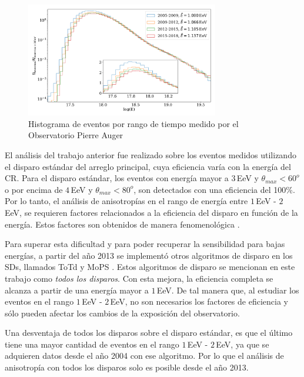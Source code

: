 \begin{figure}[htbp]
	\centering
	\includegraphics[width=0.75\textwidth]{histograma_evolucion_eventos.png}
	\caption{Histograma de eventos por rango de tiempo medido por el Observatorio Pierre Auger}
	\label{fig:futuro}
\end{figure}


El análisis del trabajo anterior fue realizado sobre los eventos medidos utilizando el disparo estándar del arreglo principal, cuya eficiencia varía con la energía del CR. Para el disparo estándar, los eventos con energía mayor a $3\,$EeV y $\theta_{max}<60^o$ o  por encima de $4\,$EeV y $\theta_{max}<80^o$, son detectados con una eficiencia del 100\%. Por lo tanto, el análisis de anisotropías en el rango de energía entre $1\,$EeV - $2\,$EeV, se requieren factores relacionados a la eficiencia del disparo en función de la energía. Estos factores son obtenidos de manera fenomenológica \cite{taborda}. 

Para superar esta dificultad y para poder recuperar la sensibilidad para bajas energías, a partir del año 2013  se implementó otros algoritmos de disparo en los SDs, llamados ToTd y MoPS \cite{pierre2013plans}. Estos algoritmos de disparo se mencionan en este trabajo como \textit{todos los disparos}. Con esta mejora, la eficiencia completa se alcanza a partir de una energía mayor a $1\,$EeV. De tal manera que, al estudiar los eventos en el rango $1\,$EeV - $2\,$EeV,  no son necesarios los factores de eficiencia y sólo pueden afectar los cambios de la exposición del observatorio.

Una desventaja de todos los disparos sobre el disparo estándar, es que el último tiene una mayor cantidad de eventos en el rango $1\,$EeV - $2\,$EeV, ya que se adquieren datos  desde el año 2004 con ese algoritmo. Por lo que el análisis de anisotropía con todos los disparos solo es posible desde el año 2013. 




